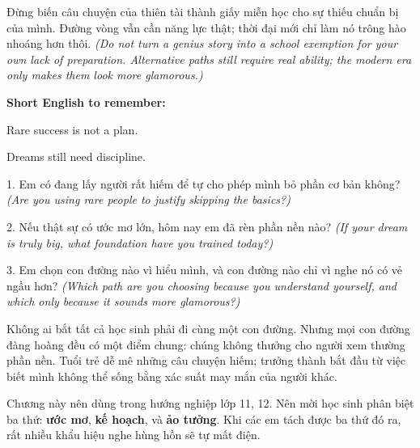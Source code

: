 \begin{baihoc}
Đừng biến câu chuyện của thiên tài thành giấy miễn học cho sự thiếu chuẩn bị của mình. Đường vòng vẫn cần năng lực thật; thời đại mới chỉ làm nó trông hào nhoáng hơn thôi.
\textit{(Do not turn a genius story into a school exemption for your own lack of preparation. Alternative paths still require real ability; the modern era only makes them look more glamorous.)}
\end{baihoc}

\begin{ghinhoanh}
\textbf{Short English to remember:}

Rare success is not a plan.

Dreams still need discipline.
\end{ghinhoanh}

\begin{tuhocnhanh}
1. Em có đang lấy người rất hiếm để tự cho phép mình bỏ phần cơ bản không? \textit{(Are you using rare people to justify skipping the basics?)}

2. Nếu thật sự có ước mơ lớn, hôm nay em đã rèn phần nền nào? \textit{(If your dream is truly big, what foundation have you trained today?)}

3. Em chọn con đường nào vì hiểu mình, và con đường nào chỉ vì nghe nó có vẻ ngầu hơn? \textit{(Which path are you choosing because you understand yourself, and which only because it sounds more glamorous?)}
\end{tuhocnhanh}

\begin{tongketchuong}
Không ai bắt tất cả học sinh phải đi cùng một con đường. Nhưng mọi con đường đàng hoàng đều có một điểm chung: chúng không thưởng cho người xem thường phần nền. Tuổi trẻ dễ mê những câu chuyện hiếm; trưởng thành bắt đầu từ việc biết mình không thể sống bằng xác suất may mắn của người khác.
\end{tongketchuong}

\begin{goigiaovien}
Chương này nên dùng trong hướng nghiệp lớp 11, 12. Nên mời học sinh phân biệt ba thứ: \textbf{ước mơ}, \textbf{kế hoạch}, và \textbf{ảo tưởng}. Khi các em tách được ba thứ đó ra, rất nhiều khẩu hiệu nghe hùng hồn sẽ tự mất điện.
\end{goigiaovien}

\ngancach